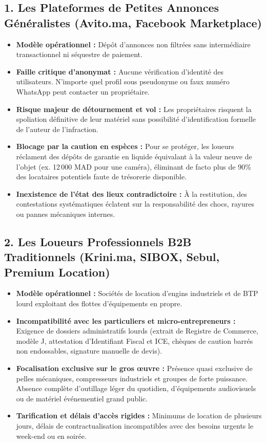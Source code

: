 \documentclass[11pt,a4paper]{report}
\begin{document}
\subsection{1. Les Plateformes de Petites Annonces Généralistes (Avito.ma, Facebook Marketplace)}
\begin{itemize}[leftmargin=*]
    \item \textbf{Modèle opérationnel :} Dépôt d'annonces non filtrées sans intermédiaire transactionnel ni séquestre de paiement.
    \item \textbf{Faille critique d'anonymat :} Aucune vérification d'identité des utilisateurs. N'importe quel profil sous pseudonyme ou faux numéro WhatsApp peut contacter un propriétaire.
    \item \textbf{Risque majeur de détournement et vol :} Les propriétaires risquent la spoliation définitive de leur matériel sans possibilité d'identification formelle de l'auteur de l'infraction.
    \item \textbf{Blocage par la caution en espèces :} Pour se protéger, les loueurs réclament des dépôts de garantie en liquide équivalant à la valeur neuve de l'objet (ex. 12\,000 MAD pour une caméra), éliminant de facto plus de 90\% des locataires potentiels faute de trésorerie disponible.
    \item \textbf{Inexistence de l'état des lieux contradictoire :} À la restitution, des contestations systématiques éclatent sur la responsabilité des chocs, rayures ou pannes mécaniques internes.
\end{itemize}

\subsection{2. Les Loueurs Professionnels B2B Traditionnels (Krini.ma, SIBOX, Sebul, Premium Location)}
\begin{itemize}[leftmargin=*]
    \item \textbf{Modèle opérationnel :} Sociétés de location d'engins industriels et de BTP lourd exploitant des flottes d'équipements en propre.
    \item \textbf{Incompatibilité avec les particuliers et micro-entrepreneurs :} Exigence de dossiers administratifs lourds (extrait de Registre de Commerce, modèle J, attestation d'Identifiant Fiscal et ICE, chèques de caution barrés non endossables, signature manuelle de devis).
    \item \textbf{Focalisation exclusive sur le gros œuvre :} Présence quasi exclusive de pelles mécaniques, compresseurs industriels et groupes de forte puissance. Absence complète d'outillage léger du quotidien, d'équipements audiovisuels ou de matériel événementiel grand public.
    \item \textbf{Tarification et délais d'accès rigides :} Minimums de location de plusieurs jours, délais de contractualisation incompatibles avec des besoins urgents le week-end ou en soirée.
\end{itemize}
\end{document}
